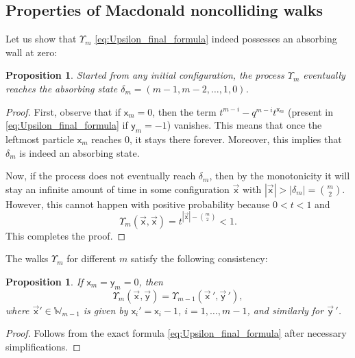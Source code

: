 \documentclass[pdftex]{sigma}
\numberwithin{equation}{section}
\newtheorem{Proposition}[Theorem]{Proposition}
{ \theoremstyle{definition}
\newtheorem{Definition}[Theorem]{Definition}}
\begin{document}
\subsection{Properties of Macdonald noncolliding walks}
\label{sub:absorbing_wall}

Let us show that $\Upsilon_m$ \eqref{eq:Upsilon_final_formula}
indeed possesses an absorbing wall at zero:
\begin{Proposition}
	\label{prop:absorbing_wall}
	Started from any initial configuration,
	the process $\Upsilon_m$ eventually reaches the absorbing state
	$\delta_m = (m-1,m-2,\dots,1,0 )$.
\end{Proposition}
\begin{proof}
	First, observe that if $\mathsf{x}_m=0$, then the term
	$t^{m-i}-q^{m-i}t^{\mathsf{x}_m}$
	(present in
	\eqref{eq:Upsilon_final_formula}
	if \mbox{$\mathsf{y}_m=-1$}) vanishes.
	This means that once the leftmost particle $\mathsf{x}_m$
	reaches $0$, it stays there forever. Moreover, this implies that
	$\delta_m$ is indeed an absorbing state.

	Now, if the process does not eventually reach $\delta_m$,
	then by the monotonicity it will stay an infinite amount of
	time in some configuration $\vec{\mathsf{x}}$ with
	$|\vec{\mathsf{x}}|>|\delta_m|=\binom m2$. However,
	this cannot happen with positive probability
	because $0<t<1$ and
	\begin{equation*}
		\Upsilon_m(\vec{\mathsf{x}},\vec{\mathsf{x}})=
		t^{|\vec{\mathsf{x}}|-\binom m2}<1.
	\end{equation*}
	This completes the proof.
\end{proof}

The walks $\Upsilon_m$ for different $m$ satisfy the following consistency:
\begin{Proposition}
	\label{prop:consistency}
	If $\mathsf{x}_m=\mathsf{y}_m=0$, then
	\begin{equation*}
		\Upsilon_m(\vec{\mathsf{x}},\vec{\mathsf{y}})=
		\Upsilon_{m-1}
		(\vec{\mathsf{x}}\,{}',\vec{\mathsf{y}}\,{}'),
	\end{equation*}
	where $\vec{\mathsf{x}}'\in \mathbb{W}_{m-1}$
	is given by
	$\mathsf{x}_i'=\mathsf{x}_i-1$, $i=1,\dots,m-1 $,
	and similarly for $\vec{\mathsf{y}}\,{}'$.
\end{Proposition}
\begin{proof}
	Follows from the exact formula \eqref{eq:Upsilon_final_formula}
	after necessary simplifications.
\end{proof}
\end{document}
